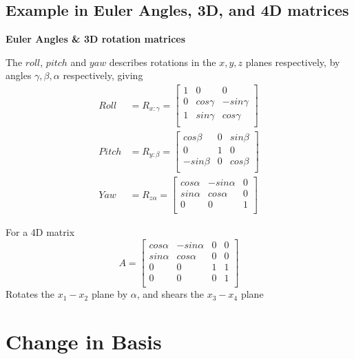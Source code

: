 \subsection{Example in Euler Angles, 3D, and 4D matrices}
\begin{framed}

   \textbf{Euler Angles \& 3D rotation matrices}

   The $roll$, $pitch$ and $yaw$ describes rotations in the  $x, y, z$ planes respectively, by angles $\gamma, \beta, \alpha$ respectively, giving 
   \begin{align*}
      Roll &= R_{x:\gamma} = \begin{bmatrix} 
         1 & 0 & 0\\  
         0 & cos\gamma & -sin\gamma\\  
         1 & sin\gamma & cos\gamma\\  
      \end{bmatrix} \\
      Pitch &= R_{y:\beta} = \begin{bmatrix} 
         cos\beta & 0 & sin\beta\\  
         0 & 1 & 0\\  
         -sin \beta & 0 & cos\beta\\  
      \end{bmatrix} \\
      Yaw &= R_{z\alpha} = \begin{bmatrix} 
         cos\alpha & -sin \alpha & 0\\  
         sin\alpha & cos\alpha & 0\\  
         0 & 0 & 1\\  
      \end{bmatrix}
   \end{align*}
   
  For a 4D matrix \[
     A = \begin{bmatrix}
       cos \alpha & -sin \alpha & 0 & 0   \\
       sin \alpha & cos \alpha & 0 & 0   \\
       0 & 0& 1 & 1   \\
       0 & 0 & 0 & 1   \\
    \end{bmatrix}
  \] 
    Rotates the $x_1 - x_2$ plane by $\alpha$, and shears the  $x_3 - x_4$ plane
\end{framed}

\section{Change in Basis}

